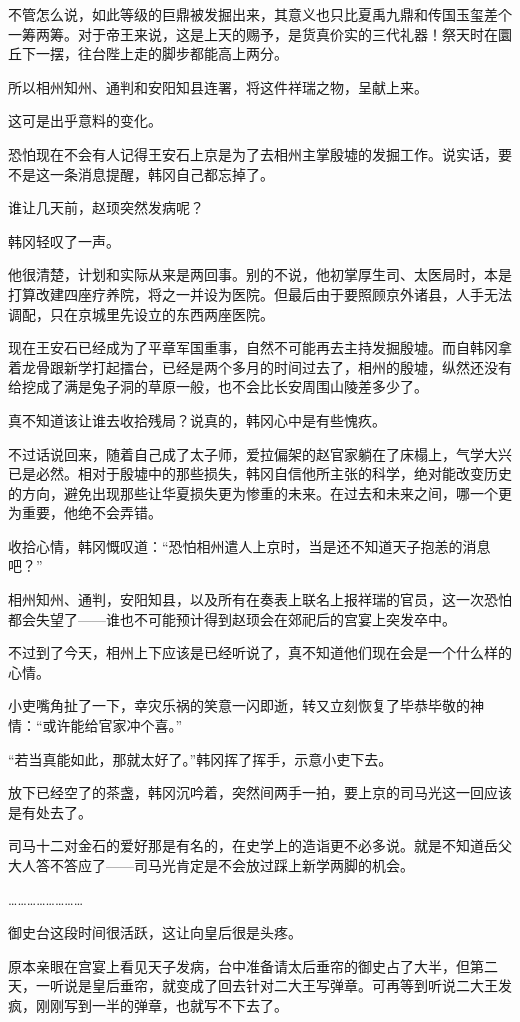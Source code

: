 不管怎么说，如此等级的巨鼎被发掘出来，其意义也只比夏禹九鼎和传国玉玺差个一筹两筹。对于帝王来说，这是上天的赐予，是货真价实的三代礼器！祭天时在圜丘下一摆，往台陛上走的脚步都能高上两分。

所以相州知州、通判和安阳知县连署，将这件祥瑞之物，呈献上来。

这可是出乎意料的变化。

恐怕现在不会有人记得王安石上京是为了去相州主掌殷墟的发掘工作。说实话，要不是这一条消息提醒，韩冈自己都忘掉了。

谁让几天前，赵顼突然发病呢？

韩冈轻叹了一声。

他很清楚，计划和实际从来是两回事。别的不说，他初掌厚生司、太医局时，本是打算改建四座疗养院，将之一并设为医院。但最后由于要照顾京外诸县，人手无法调配，只在京城里先设立的东西两座医院。

现在王安石已经成为了平章军国重事，自然不可能再去主持发掘殷墟。而自韩冈拿着龙骨跟新学打起擂台，已经是两个多月的时间过去了，相州的殷墟，纵然还没有给挖成了满是兔子洞的草原一般，也不会比长安周围山陵差多少了。

真不知道该让谁去收拾残局？说真的，韩冈心中是有些愧疚。

不过话说回来，随着自己成了太子师，爱拉偏架的赵官家躺在了床榻上，气学大兴已是必然。相对于殷墟中的那些损失，韩冈自信他所主张的科学，绝对能改变历史的方向，避免出现那些让华夏损失更为惨重的未来。在过去和未来之间，哪一个更为重要，他绝不会弄错。

收拾心情，韩冈慨叹道：“恐怕相州遣人上京时，当是还不知道天子抱恙的消息吧？”

相州知州、通判，安阳知县，以及所有在奏表上联名上报祥瑞的官员，这一次恐怕都会失望了——谁也不可能预计得到赵顼会在郊祀后的宫宴上突发卒中。

不过到了今天，相州上下应该是已经听说了，真不知道他们现在会是一个什么样的心情。

小吏嘴角扯了一下，幸灾乐祸的笑意一闪即逝，转又立刻恢复了毕恭毕敬的神情：“或许能给官家冲个喜。”

“若当真能如此，那就太好了。”韩冈挥了挥手，示意小吏下去。

放下已经空了的茶盏，韩冈沉吟着，突然间两手一拍，要上京的司马光这一回应该是有处去了。

司马十二对金石的爱好那是有名的，在史学上的造诣更不必多说。就是不知道岳父大人答不答应了——司马光肯定是不会放过踩上新学两脚的机会。

……………………

御史台这段时间很活跃，这让向皇后很是头疼。

原本亲眼在宫宴上看见天子发病，台中准备请太后垂帘的御史占了大半，但第二天，一听说是皇后垂帘，就变成了回去针对二大王写弹章。可再等到听说二大王发疯，刚刚写到一半的弹章，也就写不下去了。

